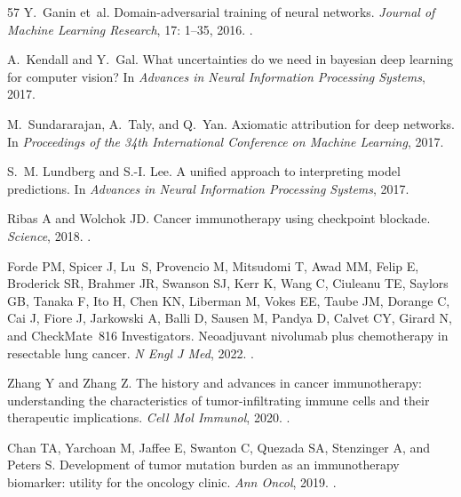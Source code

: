 \documentclass[11pt]{article}
\begin{document}
\begin{thebibliography}{57}
Y.~Ganin et~al.
\newblock Domain-adversarial training of neural networks.
\newblock \emph{Journal of Machine Learning Research}, 17: 1--35,
  2016.
\newblock {}.

A.~Kendall and Y.~Gal.
\newblock What uncertainties do we need in bayesian deep learning for computer
  vision?
\newblock In \emph{Advances in Neural Information Processing Systems}, 2017.

M.~Sundararajan, A.~Taly, and Q.~Yan.
\newblock Axiomatic attribution for deep networks.
\newblock In \emph{Proceedings of the 34th International Conference on Machine
  Learning}, 2017.

S.~M. Lundberg and S.-I. Lee.
\newblock A unified approach to interpreting model predictions.
\newblock In \emph{Advances in Neural Information Processing Systems}, 2017.

Ribas A and Wolchok JD.
\newblock Cancer immunotherapy using checkpoint blockade.
\newblock \emph{Science}, 2018.
\newblock {}.

Forde PM, Spicer J, Lu~S, Provencio M, Mitsudomi T, Awad MM, Felip E, Broderick
  SR, Brahmer JR, Swanson SJ, Kerr K, Wang C, Ciuleanu TE, Saylors GB, Tanaka
  F, Ito H, Chen KN, Liberman M, Vokes EE, Taube JM, Dorange C, Cai J, Fiore J,
  Jarkowski A, Balli D, Sausen M, Pandya D, Calvet CY, Girard N, and
  CheckMate~816 Investigators.
\newblock Neoadjuvant nivolumab plus chemotherapy in resectable lung cancer.
\newblock \emph{N Engl J Med}, 2022.
\newblock {}.

Zhang Y and Zhang Z.
\newblock The history and advances in cancer immunotherapy: understanding the
  characteristics of tumor-infiltrating immune cells and their therapeutic
  implications.
\newblock \emph{Cell Mol Immunol}, 2020.
\newblock {}.

Chan TA, Yarchoan M, Jaffee E, Swanton C, Quezada SA, Stenzinger A, and Peters
  S.
\newblock Development of tumor mutation burden as an immunotherapy biomarker:
  utility for the oncology clinic.
\newblock \emph{Ann Oncol}, 2019.
\newblock {}.


\end{thebibliography}
\end{document}
